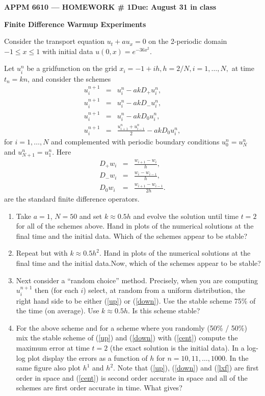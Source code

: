 \documentclass[11pt]{article}
\begin{document}
\begin{center}
\textbf{APPM 6610 --- HOMEWORK  \# 1\hfill Due: August 31 in class}
\end{center}

\begin{center}
{\bf Finite Difference Warmup Experiments}
\end{center}

Consider the transport equation $u_t+au_x = 0$ on the 2-periodic domain $-1 \le x \le 1$ with initial data $u(0,x) = e^{-36x^2}$.

Let $u_i^n$ be a gridfunction on the grid $x_i = -1+i h, h = 2/N, i = 1,\ldots,N,$ at time $t_n = kn$, and consider the schemes 
\begin{eqnarray}
u^{n+1}_i &=& u^n_i - ak D_+ u^n_i, \label{up}\\
u^{n+1}_i &=& u^n_i - ak D_- u^n_i, \label{down} \\
u^{n+1}_i &=& u^n_i - ak D_0 u^n_i, \label{cent} \\
u^{n+1}_i &=& \frac{u^n_{i+1}+u^n_{i-1}}{2} - ak D_0 u^n_i, \label{lxf}
\end{eqnarray}
for $i = 1,\ldots,N$ and complemented with periodic boundary conditions $u^n_0 = u^n_N$ and $u^n_{N+1} = u^n_1$. Here    
\begin{eqnarray*}
D_+ w_{i} &=& \frac{w_{i+1}-w_{i}}{h}, \\
D_- w_{i} &=& \frac{w_{i}-w_{i-1}}{h}, \\
D_0 w_{i} &=& \frac{w_{i+1}-w_{i-1}}{2h}.
\end{eqnarray*}
are the standard finite difference operators. 

\begin{enumerate}
\item Take $a = 1$, $N=50$ and set $k \approx 0.5h $ and evolve the solution until time $t = 2$ for all of the schemes above. Hand in plots of the numerical solutions at the final time and the initial data. Which of the schemes appear to be stable?  
\item Repeat but with $k \approx 0.5h^2 $. Hand in plots of the numerical solutions at the final time and the initial data.Now, which of the schemes appear to be stable?  
\item  Next consider a ``random choice'' method. Precisely, when you are computing $u^{n+1}_i$ then (for each $i$) select, at random from a uniform distribution, the right hand side to be either (\ref{up}) or (\ref{down}). Use the stable scheme 75\% of the time (on average). Use $k\approx 0.5h$. Is this scheme stable? 
\item For the above scheme and for a scheme where you randomly (50\% / 50\%) mix the stable scheme of (\ref{up}) and (\ref{down}) with (\ref{cent}) compute the maximum error at time $t=2$ (the exact solution is the initial data). In a log-log plot display the errors as a function of $h$ for $n = 10,11,\ldots, 1000$. In the same figure also plot $h^1$ and $h^2$. Note that (\ref{up}), (\ref{down}) and (\ref{lxf}) are first order in space and (\ref{cent}) is second order accurate in space and all of the schemes are first order accurate in time. What gives?   
\end{enumerate}
\end{document}
